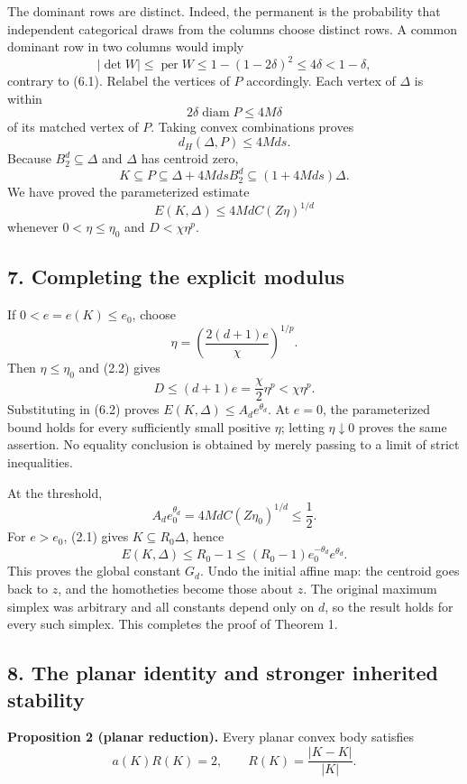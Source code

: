 \documentclass[
  11pt,
]{article}
\begin{document}
The dominant rows are distinct. Indeed, the permanent is the probability
that independent categorical draws from the columns choose distinct
rows. A common dominant row in two columns would imply
\[|\det W|\le\operatorname{per}W
\le1-(1-2\delta)^2\le4\delta<1-\delta,\] contrary to (6.1). Relabel the
vertices of \(P\) accordingly. Each vertex of \(\Delta\) is within
\[2\delta\operatorname{diam}P\le4M\delta\] of its matched vertex of
\(P\). Taking convex combinations proves \[d_H(\Delta,P)\le4Md s.\]
Because \(B_2^d\subseteq\Delta\) and \(\Delta\) has centroid zero,
\[K\subseteq P\subseteq\Delta+4Md sB_2^d
\subseteq(1+4Md s)\Delta.\] We have proved the parameterized estimate
\[E(K,\Delta)\le4MdC(Z\eta)^{1/d}\tag{6.2}\] whenever
\(0<\eta\le\eta_0\) and \(D<\chi\eta^p\).

\subsection{7. Completing the explicit
modulus}\label{completing-the-explicit-modulus}

If \(0<e=e(K)\le e_0\), choose
\[\eta=\left(\frac{2(d+1)e}{\chi}\right)^{1/p}.\] Then \(\eta\le\eta_0\)
and (2.2) gives \[D\le(d+1)e=\frac\chi2\eta^p<\chi\eta^p.\] Substituting
in (6.2) proves \(E(K,\Delta)\le A_de^{\theta_d}\). At \(e=0\), the
parameterized bound holds for every sufficiently small positive
\(\eta\); letting \(\eta\downarrow0\) proves the same assertion. No
equality conclusion is obtained by merely passing to a limit of strict
inequalities.

At the threshold, \[A_de_0^{\theta_d}=4MdC(Z\eta_0)^{1/d}\le\frac12.\]
For \(e>e_0\), (2.1) gives \(K\subseteq R_0\Delta\), hence
\[E(K,\Delta)\le R_0-1
\le(R_0-1)e_0^{-\theta_d}e^{\theta_d}.\] This proves the global constant
\(G_d\). Undo the initial affine map: the centroid goes back to \(z\),
and the homotheties become those about \(z\). The original maximum
simplex was arbitrary and all constants depend only on \(d\), so the
result holds for every such simplex. This completes the proof of Theorem
1.

\subsection{8. The planar identity and stronger inherited
stability}\label{the-planar-identity-and-stronger-inherited-stability}

\textbf{Proposition 2 (planar reduction).} Every planar convex body
satisfies \[a(K)R(K)=2,\qquad R(K)=\frac{|K-K|}{|K|}.\]
\end{document}
